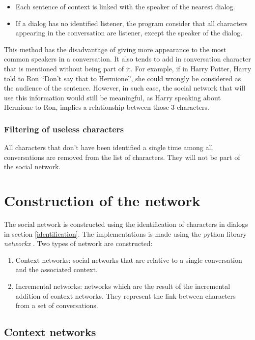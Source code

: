 \documentclass[a4paper, 12pt]{report}
\begin{document}
\begin{itemize}
\item Each sentence of context is linked with the speaker of the nearest dialog.

\item If a dialog has no identified listener, the program consider that all characters appearing in the conversation are listener, except the speaker of the dialog.
\end{itemize}
This method has the disadvantage of giving more appearance to the most common speakers in a conversation. It also tends to add in conversation character that is mentioned without being part of it. For example, if in Harry Potter, Harry told to Ron ``Don't say that to Hermione'', she could wrongly be considered as the audience of the sentence. However, in such case, the social network that will use this information would still be meaningful, as Harry speaking about Hermione to Ron, implies a relationship between those 3 characters.


\subsubsection{Filtering of useless characters}
All characters that don't have been identified a single time among all conversations are removed from the list of characters. They will not be part of the social network.



\section{Construction of the network}

The social network is constructed using the identification of characters in dialogs in section \ref{identification}. The implementations is made using the python library \textit{networkx} \citep{networkx}.
Two types of network are constructed:
\begin{enumerate}
\item Context networks: social networks that are relative to a single conversation and the associated context.
\item Incremental networks: networks which are the result of the incremental addition of context networks. They represent the link between characters from a set of conversations.
\end{enumerate}
\subsection{Context networks}
\end{document}
